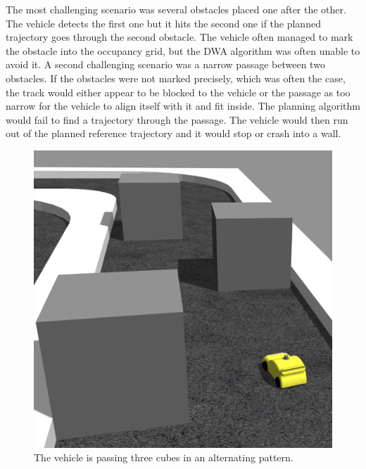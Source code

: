 The most challenging scenario was several obstacles placed one after the other. The vehicle detects the first one but it hits the second one if the planned trajectory goes through the second obstacle. The vehicle often managed to mark the obstacle into the occupancy grid, but the DWA algorithm was often unable to avoid it. A second challenging scenario was a narrow passage between two obstacles. If the obstacles were not marked precisely, which was often the case, the track would either appear to be blocked to the vehicle or the passage as too narrow for the vehicle to align itself with it and fit inside. The planning algorithm would fail to find a trajectory through the passage. The vehicle would then run out of the planned reference trajectory and it would stop or crash into a wall.
\begin{figure}
	\centering
	\includegraphics[width=\textwidth]{../img/experiments/simulator/obstacles-gazebo.png}
	\caption{The vehicle is passing three cubes in an alternating pattern.}
	\label{fig:obstacle-avoidance-gazebo}
\end{figure}

